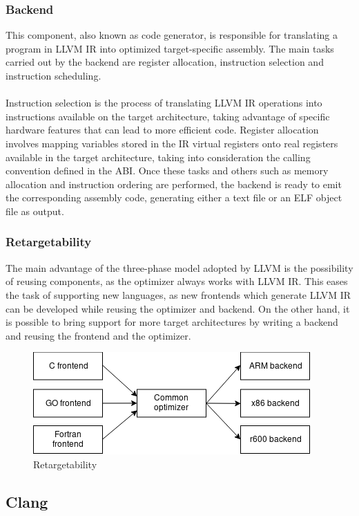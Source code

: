 \documentclass[12pt,a4paper,oneside]{article}
\begin{document}
\subsubsection{Backend}
This component, also known as code generator, is responsible for translating a
program in LLVM IR into optimized target-specific assembly. The main tasks
carried out by the backend are register allocation, instruction selection and
instruction scheduling. \\\\
Instruction selection is the process of translating LLVM IR operations into
instructions available on the target architecture, taking advantage of specific
hardware features that can lead to more efficient code. Register allocation
involves mapping variables stored in the IR virtual registers onto real registers
available in the target architecture, taking into consideration the calling
convention defined in the ABI. Once these tasks and others such as memory
allocation and instruction ordering are performed, the backend is ready to emit
the corresponding assembly code, generating either a text file or an ELF object
file as output.

\subsubsection{Retargetability}

The main advantage of the three-phase model adopted by LLVM is the possibility of
reusing components, as the optimizer always works with LLVM IR. This eases the
task of supporting new languages, as new frontends which generate LLVM IR can be
developed while reusing the optimizer and backend. On the other hand, it is
possible to bring support for more target architectures by writing a backend
and reusing the frontend and the optimizer.

\begin{figure}[H]
\centering
  \includegraphics[scale=0.8]{img/targets.png}
  \caption{Retargetability}
  \label{fig:targets}
\end{figure}

\subsection{Clang}
\end{document}
